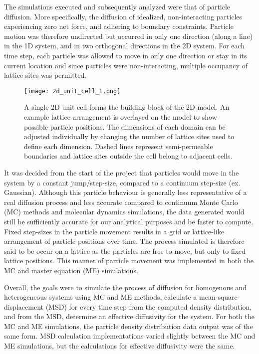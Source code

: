 	The simulations executed and subsequently analyzed were that of particle diffusion. More specifically, the diffusion of idealized, non-interacting particles experiencing zero net force, and adhering to boundary constraints. Particle motion was therefore undirected but occurred in only one direction (along a line) in the 1D system, and in two orthogonal directions in the 2D system. For each time step, each particle was allowed to move in only one direction or stay in its current location and since particles were non-interacting, multiple occupancy of lattice sites was permitted.
	
	\begin{figure}[h]
		\centering
		\texttt{[image: 2d\_unit\_cell\_1.png]}
		\caption{A single 2D unit cell forms the building block of the 2D model. An example lattice arrangement is overlayed on the model to show possible particle positions. The dimensions of each domain can be adjusted individually by changing the number of lattice sites used to define each dimension. Dashed lines represent semi-permeable boundaries and lattice sites outside the cell belong to adjacent cells.}
		\label{fig:2d_unit_cell_1.png}
	\end{figure}

	It was decided from the start of the project that particles would move in the system by a constant jump/step-size, compared to a continuum step-size (ex. Gaussian). Although this particle behaviour is generally less representative of a real diffusion process and less accurate compared to continuum Monte Carlo (MC) methods and molecular dynamics simulations, the data generated would still be sufficiently accurate for our analytical purposes and be faster to compute. Fixed step-sizes in the particle movement results in a grid or lattice-like arrangement of particle positions over time. The process simulated is therefore said to be occur on a lattice as the particles are free to move, but only to fixed lattice positions. This manner of particle movement was implemented in both the MC and master equation (ME) simulations.

	Overall, the goals were to simulate the process of diffusion for homogenous and heterogeneous systems using MC and ME methods, calculate a mean-square-displacement (MSD) for every time step from the computed density distribution, and from the MSD, determine an effective diffusivity for the system. For both the MC and ME simulations, the particle density distribution data output was of the same form. MSD calculation implementations varied slightly between the MC and ME simulations, but the calculations for effective diffusivity were the same. 	

